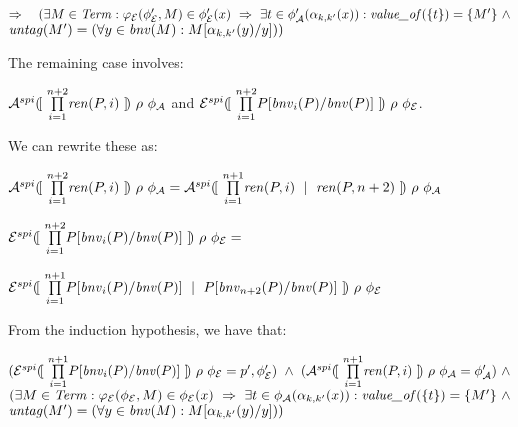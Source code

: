 \documentclass[10pt,a4paper,final,oneside,fleqn]{book}
\begin{document}
\noindent
$\Rightarrow~~~(\exists M\in\mbox{{\itshape Term\/}}:\varphi_\mathcal{E}(\phi'_\mathcal{E},M)\in\phi'_\mathcal{E}(x)~\Rightarrow~\exists t\in\phi'_\mathcal{A}(\alpha_{k,k'}(x)): \mbox{{\itshape value\_of\/}}(\{t\})=\{M'\}~\wedge$\\
$\mbox{{\itshape untag\/}}(M')=(\forall y\in\mbox{{\itshape bnv\/}}(M):M[\alpha_{k,k'}(y)/y]))$\vspace{5mm}

\noindent
The remaining case involves:

\noindent
$\mathcal{A}^{spi}(\![~\underset{i=1}{\overset{n+2}{\prod}}\mbox{{\itshape ren\/}}(P,i)~]\!)~\rho~\phi_\mathcal{A}$ and $\mathcal{E}^{spi}(\![~\underset{i=1}{\overset{n+2}{\prod}}P[\mbox{{\itshape bnv\/}}_i(P)/\mbox{{\itshape bnv\/}}(P)]~]\!)~\rho~\phi_\mathcal{E}$.

\noindent
We can rewrite these as:

\noindent
$\mathcal{A}^{spi}(\![~\underset{i=1}{\overset{n+2}{\prod}}\mbox{{\itshape ren\/}}(P,i)~]\!)~\rho~\phi_\mathcal{A}=\mathcal{A}^{spi}(\![~\underset{i=1}{\overset{n+1}{\prod}}\mbox{{\itshape ren\/}}(P,i)~\mid~\mbox{{\itshape ren\/}}(P,n+2)~]\!)~\rho~\phi_\mathcal{A}$\vspace{5mm}

\noindent
$\mathcal{E}^{spi}(\![~\underset{i=1}{\overset{n+2}{\prod}}P[\mbox{{\itshape bnv\/}}_i(P)/\mbox{{\itshape bnv\/}}(P)]~]\!)~\rho~\phi_\mathcal{E}=$

\noindent
$\mathcal{E}^{spi}(\![~\underset{i=1}{\overset{n+1}{\prod}}P[\mbox{{\itshape bnv\/}}_i(P)/\mbox{{\itshape bnv\/}}(P)]~\mid~P[\mbox{{\itshape bnv\/}}_{n+2}(P)/\mbox{{\itshape bnv\/}}(P)]~]\!)~\rho~\phi_\mathcal{E}$\vspace{5mm}

\noindent
From the induction hypothesis, we have that:

\noindent
$(\mathcal{E}^{spi}(\![~\underset{i=1}{\overset{n+1}{\prod}}P[\mbox{{\itshape bnv\/}}_i(P)/\mbox{{\itshape bnv\/}}(P)]~]\!)~\rho~\phi_\mathcal{E}=p',\phi'_\mathcal{E})~\wedge~(\mathcal{A}^{spi}(\![~\underset{i=1}{\overset{n+1}{\prod}}\mbox{{\itshape ren\/}}(P,i)~]\!)~\rho~\phi_\mathcal{A}=\phi'_\mathcal{A})~\wedge$\\
$(\exists M\in\mbox{{\itshape Term\/}}:\varphi_\mathcal{E}(\phi_\mathcal{E},M)\in\phi_\mathcal{E}(x)~\Rightarrow~\exists t\in\phi_\mathcal{A}(\alpha_{k,k'}(x)):\mbox{{\itshape value\_of\/}}(\{t\})=\{M'\}~\wedge$\\
$\mbox{{\itshape untag\/}}(M')=(\forall y\in\mbox{{\itshape bnv\/}}(M):M[\alpha_{k,k'}(y)/y]))$\vspace{5mm}
\end{document}
